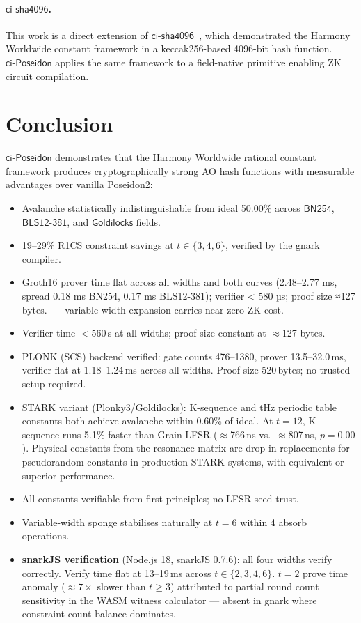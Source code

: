 \documentclass[preprint]{iacrtrans}
\newcommand{\BN}{\ensuremath{\mathsf{BN254}}}
\newcommand{\BLS}{\ensuremath{\mathsf{BLS12\text{-}381}}}
\newcommand{\GL}{\ensuremath{\mathsf{Goldilocks}}}
\newcommand{\ciposeidon}{\ensuremath{\mathsf{ci\text{-}Poseidon}}}
\newcommand{\cisha}{\ensuremath{\mathsf{ci\text{-}sha4096}}}
\begin{document}
\paragraph{\cisha{}.}
This work is a direct extension of \cisha{}~\cite{See26}, which demonstrated
the Harmony Worldwide constant framework in a keccak256-based 4096-bit hash
function. \ciposeidon{} applies the same framework to a field-native
primitive enabling ZK circuit compilation.

\section{Conclusion}

\ciposeidon{} demonstrates that the Harmony Worldwide rational constant
framework produces cryptographically strong AO hash functions with measurable
advantages over vanilla Poseidon2:

\begin{itemize}
  \item Avalanche statistically indistinguishable from ideal 50.00\% across
    $\BN$, $\BLS$, and $\GL$ fields.
  \item 19--29\% R1CS constraint savings at $t \in \{3,4,6\}$, verified by
    the gnark compiler.
  \item Groth16 prover time flat across all widths and both curves (2.48–2.77 ms, spread 0.18 ms BN254, 0.17 ms BLS12-381); verifier < 580 µs; proof size ≈127 bytes.~---
    variable-width expansion carries near-zero ZK cost.
  \item Verifier time $<560$\,\textmu{}s at all widths; proof size constant
    at $\approx$127 bytes.
  \item PLONK (SCS) backend verified: gate counts 476--1380, prover
    13.5--32.0\,ms, verifier flat at 1.18--1.24\,ms across all widths.
    Proof size 520\,bytes; no trusted setup required.
  \item STARK variant (Plonky3/Goldilocks): K-sequence and tHz periodic
  table constants both achieve avalanche within 0.60\% of ideal. At $t=12$,
  K-sequence runs 5.1\% faster than Grain LFSR ($\approx$766\,ns vs.\
  $\approx$807\,ns, $p=0.00$). Physical constants from the resonance matrix
  are drop-in replacements for pseudorandom constants in production STARK
  systems, with equivalent or superior performance.
  \item All constants verifiable from first principles; no LFSR seed trust.
  \item Variable-width sponge stabilises naturally at $t=6$ within 4 absorb
    operations.
  \item \textbf{snarkJS verification} (Node.js 18, snarkJS 0.7.6): all four widths
  verify correctly. Verify time flat at 13--19\,ms across $t \in \{2,3,4,6\}$.
  $t=2$ prove time anomaly (${\approx}7\times$ slower than $t \geq 3$) attributed
  to partial round count sensitivity in the WASM witness calculator — absent in
  gnark where constraint-count balance dominates.
\end{itemize}
\end{document}
